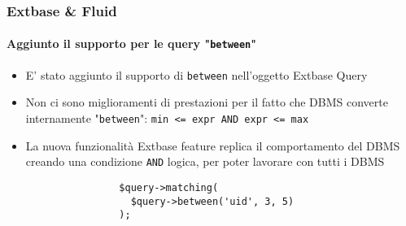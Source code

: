 
\begin{frame}[fragile]
	\frametitle{Extbase \& Fluid}
	\framesubtitle{Aggiunto il supporto per le query "\texttt{between}"}

	\begin{itemize}

		\item E' stato aggiunto il supporto di \texttt{between} nell'oggetto Extbase Query

		\item Non ci sono miglioramenti di prestazioni per il fatto che DBMS converte internamente
			"\texttt{between}": \texttt{min <= expr AND expr <= max}

		\item La nuova funzionalità Extbase feature replica il comportamento del DBMS creando una condizione
			\texttt{AND} logica, per poter lavorare con tutti i DBMS

			\begin{lstlisting}
				$query->matching(
				  $query->between('uid', 3, 5)
				);
			\end{lstlisting}

	\end{itemize}

\end{frame}


